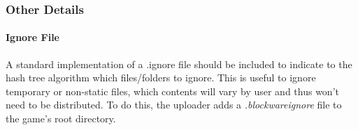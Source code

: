 
\subsubsection{Other Details}

\paragraph*{Ignore File} A standard implementation of a .ignore file should be included to indicate to the hash tree algorithm which files/folders to ignore. This is useful to ignore temporary or non-static files, which contents will vary by user and thus won't need to be distributed. To do this, the uploader adds a \textit{.blockwareignore} file to the game's root directory.
